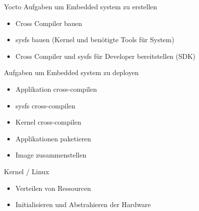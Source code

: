 \begin{frame}{Yocto}
	Aufgaben um Embedded system zu erstellen
	\begin{itemize}
		\item Cross Compiler bauen
		\item sysfs bauen (Kernel und benötigte Tools für System)
		\item Cross Compiler und sysfs für Developer bereitstellen (SDK)
	\end{itemize}
	Aufgaben um Embedded system zu deployen
	\begin{itemize}
		\item Applikation cross-compilen
		\item sysfs cross-compilen
		\item Kernel cross-compilen
		\item Applikationen paketieren
		\item Image zusammenstellen
	\end{itemize}
\end{frame}

\begin{frame}{Kernel / Linux}
	\begin{itemize}
		\item Verteilen von Ressourcen
		\item Initialisieren und Abstrahieren der Hardware
	\end{itemize}
\end{frame}

